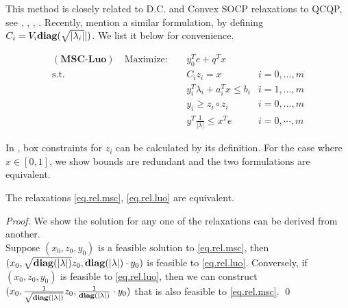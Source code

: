\documentclass[../main]{subfiles}
\begin{document}
This method is closely related to D.C. and Convex SOCP relaxations to QCQP, see \cite{zheng_convex_2011}, \cite{zheng_nonconvex_2011}, \cite{jiang_simultaneous_2016}, \cite{ye_new_2003}. Recently, \cite{luo_new_2019} mention a similar formulation, by defining \(C_i = V_i\mathbf{diag}(\sqrt{|\lambda_i|}|)\). We list it below for convenience.

\begin{equation}
  \begin{aligned} \label{eq.rel.luo}
    (\textbf{MSC-Luo})\quad \mathrm{Maximize: }\quad & y_0 ^Te + q^Tx                                      \\
    \mathrm{s.t.} \quad                              & C_i z_i = x                        & i=0,...,m      \\
                                                     & y_i ^T\lambda_i  + a_i^Tx  \le b_i & i=1,...,m      \\
                                                     & y_i \ge z_i \circ z_i              & i=0,...,m      \\
                                                     & y^T\frac{1}{|\lambda|}  \le x^Te   & i=0, \cdots, m
  \end{aligned}
\end{equation}


In \cite{luo_new_2019}, box constraints for \(z_i\) can be calculated by its definition. For the case where \(x\in [0, 1]\), we show bounds are redundant and the two formulations are equivalent.

\begin{theorem}
  The relaxations \eqref{eq.rel.msc}, \eqref{eq.rel.luo} are equivalent.
\end{theorem}

\begin{proof}
  We show the solution for any one of the relaxations can be derived from another. \\ Suppose $(x_0, z_0, y_0)$ is a feasible solution to \eqref{eq.rel.msc}, then $(x_0, \sqrt{\mathbf{diag}(|\lambda|)} z_0, \mathbf{diag}(|\lambda|) \cdot y_0)$ is feasible to \eqref{eq.rel.luo}. Conversely, if $(x_0, z_0, y_0)$ is feasible to \eqref{eq.rel.luo}, then we can construct $(x_0, \frac{1}{\sqrt{\mathbf{diag}(|\lambda|)}} z_0, \frac{1}{\mathbf{diag}(|\lambda|)}\cdot y_0)$ that is also feasible to \eqref{eq.rel.msc}. \qed
\end{proof}
\end{document}
